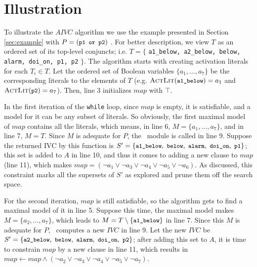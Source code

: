 \section{Illustration}
\label{sec:illust}
To illustrate the $AIVC$ algorithm we use the example presented in Section \ref{sec:example} with $P = (\small{\texttt{p1 or p2}})$ .
For better description, we view $T$ as an ordered set of its top-level conjuncts; i.e. $T = \{$ {\small \texttt{a1\_below, a2\_below, below, alarm, doi\_on, p1, p2}} $\}$.
The algorithm starts with creating activation literals for each $T_i \in T$. Let the ordered set of Boolean variables $\{ a_1, \ldots , a_7 \}$ be the corresponding literals to the elements of $T$ (e.g. $\actlit (\small{\texttt{a1\_below}}) = a_1$ and $\actlit (\small{\texttt{p2}}) = a_7$). Then, line 3 initializes $map$ with $\top$.

In the first iteration of the \texttt{while} loop, since $map$ is empty,
it is satisfiable, and a model for it can
be any subset of literals. So obviously, the first maximal model of $map$ contains all the literals, which means, in line 6, $M = \{a_1, \ldots, a_7\}$,
 and in line 7, $M = T$. Since $M$ is adequate for $P$,
 the \getivc ~module is called in line 9.
 Suppose the returned IVC by this function  is
 $S' = \{ \small{ \texttt{a1\_below},~\texttt{below}, ~\texttt{alarm},
~\texttt{doi\_on},~\texttt{p1}}\}$;
this set is added to $A$ in line 10, and thus it comes to adding a new clause to $map$ (line 11), which makes $map = (\neg a_1 \vee \neg a_3 \vee \neg a_4 \vee \neg a_5 \vee \neg a_6)$.
As discussed, this constraint marks all the supersets of $S'$ as explored and prune them off the search space.

For the second iteration, $map$ is still satisfiable,
so the algorithm gets to find a maximal model of it in line 5. Suppose this time, the maximal model makes $M = \{a_2, \ldots, a_7\}$,
which leads to $M = T \setminus \{\small{\texttt{a1\_below}}\} $ in line 7.
Since this $M$ is adequate for $P$, \getivc ~computes a new $IVC$ in line 9.
Let the new $IVC$ be $S' = \{ \small{ \texttt{a2\_below},~\texttt{below}, ~\texttt{alarm},
~\texttt{doi\_on},~\texttt{p2}}\}$; after adding this set to $A$,
it is time to constrain $map$ by a new clause in line 11,
which results in $map \leftarrow map \wedge (\neg a_2 \vee \neg a_3 \vee \neg a_4 \vee \neg a_5 \vee \neg a_7)$.

